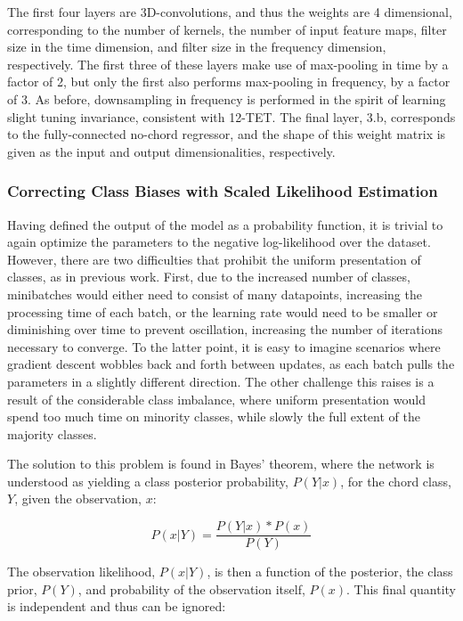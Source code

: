 The first four layers are 3D-convolutions, and thus the weights are 4 dimensional, corresponding to the number of kernels, the number of input feature maps, filter size in the time dimension, and filter size in the frequency dimension, respectively.
The first three of these layers make use of max-pooling in time by a factor of 2, but only the first also performs max-pooling in frequency, by a factor of 3.
As before, downsampling in frequency is performed in the spirit of learning slight tuning invariance, consistent with 12-TET.
The final layer, 3.b, corresponds to the fully-connected no-chord regressor, and the shape of this weight matrix is given as the input and output dimensionalities, respectively.


\subsubsection{Correcting Class Biases with Scaled Likelihood Estimation}
\label{subsubsec:scaled_likelihood_estimation}
Having defined the output of the model as a probability function, it is trivial to again optimize the parameters to the negative log-likelihood over the dataset.
However, there are two difficulties that prohibit the uniform presentation of classes, as in previous work.
First, due to the increased number of classes, minibatches would either need to consist of many datapoints, increasing the processing time of each batch, or the learning rate would need to be smaller or diminishing over time to prevent oscillation, increasing the number of iterations necessary to converge.
To the latter point, it is easy to imagine scenarios where gradient descent wobbles back and forth between updates, as each batch pulls the parameters in a slightly different direction.
The other challenge this raises is a result of the considerable class imbalance, where uniform presentation would spend too much time on minority classes, while slowly the full extent of the majority classes.

The solution to this problem is found in Bayes' theorem, where the network is understood as yielding a class posterior probability, $P(Y|x)$, for the chord class, $Y$, given the observation, $x$:

\begin{equation}
P(x|Y) = \frac{P(Y|x)*P(x)}{P(Y)}
\end{equation}

The observation likelihood, $P(x|Y)$, is then a function of the posterior, the class prior, $P(Y)$, and probability of the observation itself, $P(x)$.
This final quantity is independent and thus can be ignored:

